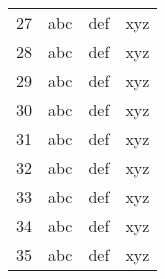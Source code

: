 \begin{center}
\begin{longtable}{cccc}
    27 &  abc  &  def  &  xyz \\
    28 &  abc  &  def  &  xyz \\
    29 &  abc  &  def  &  xyz \\
    30 &  abc  &  def  &  xyz \\
    31 &  abc  &  def  &  xyz \\
    32 &  abc  &  def  &  xyz \\
    33 &  abc  &  def  &  xyz \\
    34 &  abc  &  def  &  xyz \\
    35 &  abc  &  def  &  xyz \\
  \end{longtable}
\end{center}
